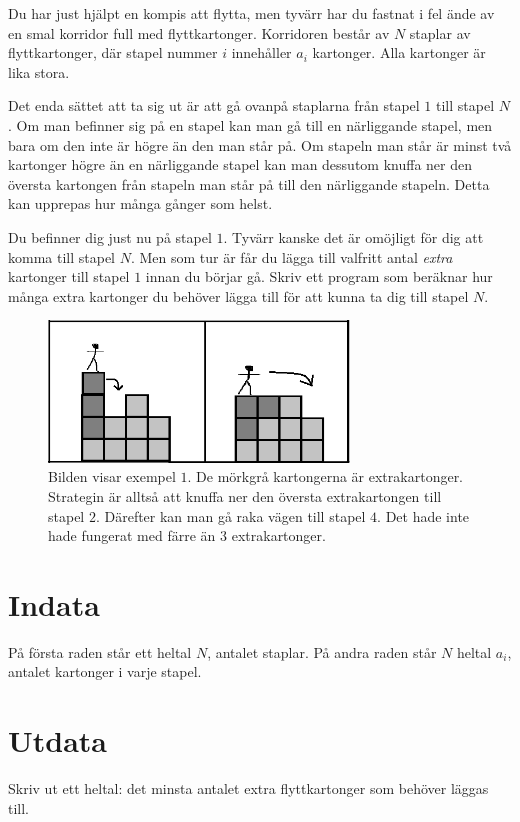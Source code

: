 

Du har just hjälpt en kompis att flytta, men tyvärr har du fastnat i
fel ände av en smal korridor full med flyttkartonger. Korridoren
består av $N$ staplar av flyttkartonger, där stapel nummer $i$
innehåller $a_i$ kartonger. Alla kartonger är lika stora.

Det enda sättet att ta sig ut är att gå ovanpå staplarna från stapel
$1$ till stapel $N$. Om man befinner sig på en stapel kan man gå till
en närliggande stapel, men bara om den inte är högre än den man står
på. Om stapeln man står är minst två kartonger högre än en närliggande
stapel kan man dessutom knuffa ner den översta kartongen från stapeln
man står på till den närliggande stapeln. Detta kan upprepas hur många
gånger som helst. 

Du befinner dig just nu på stapel $1$. Tyvärr kanske det är omöjligt
för dig att komma till stapel $N$. Men som tur är får du lägga till
valfritt antal {\em extra} kartonger till stapel $1$ innan du börjar gå. Skriv ett program som
beräknar hur många extra kartonger du behöver lägga till för att kunna
ta dig till stapel $N$.

\begin{figure}[!h]
\begin{center}
\includegraphics[width=8cm]{kartongbild2.png}
\end{center}
\caption{Bilden visar exempel $1$. De mörkgrå kartongerna är extrakartonger. Strategin är alltså att knuffa ner den översta extrakartongen till stapel $2$. Därefter kan man gå raka vägen till stapel $4$. Det hade inte hade fungerat med färre än $3$ extrakartonger.}
\end{figure}

\section*{Indata}
På första raden står ett heltal $N$, antalet staplar. På andra raden står $N$ heltal $a_i$, antalet kartonger i varje stapel. 

\section*{Utdata}
Skriv ut ett heltal: det minsta antalet extra flyttkartonger som behöver läggas till.


